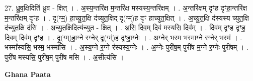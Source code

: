 \documentclass[17pt]{extarticle}
\begin{document}
27. ध्रु॒व॒क्षिदिति॑ ध्रुव - क्षित् । . अ॒स्य॒न्तरि॑क्ष म॒न्तरि॑क्ष मस्यस्य॒न्तरि॑क्षम् । . अ॒न्तरि॑क्षम् दृꣳह दृꣳहा॒न्तरि॑क्ष म॒न्तरि॑क्षम् दृꣳह । . दृ॒(ग्म्॒) हा॒च्यु॒त॒क्षि द॑च्युत॒क्षिद् दृ(ग्म्॑)ह दृꣳ हाच्युत॒क्षित् । . अ॒च्यु॒त॒क्षि द॑स्यस्य च्युत॒क्षि द॑च्युत॒क्षि द॑सि । . अ॒च्यु॒त॒क्षिदित्य॑च्युत - क्षित् । . अ॒सि॒ दिव॒म् दिव॑ मस्यसि॒ दिव᳚म् । . दिव॑म् दृꣳह दृꣳह॒ दिव॒म् दिव॑म् दृꣳह । . दृ॒(ग्म्॒)हा॒ग्ने र॒ग्नेर् दृ(ग्म्॑)ह दृꣳहा॒ग्नेः । . अ॒ग्नेर् भस्म॒ भस्मा॒ग्ने र॒ग्नेर् भस्म॑ । . भस्मा᳚स्यसि॒ भस्म॒ भस्मा॑सि । . अ॒स्य॒ग्ने र॒ग्ने र॑स्यस्य॒ग्नेः । . अ॒ग्नेः पुरी॑ष॒म् पुरी॑ष म॒ग्ने र॒ग्नेः पुरी॑षम् । . पुरी॑ष मस्यसि॒ पुरी॑ष॒म् पुरी॑ष मसि । . अ॒सीत्य॑सि । \newline

\textbf{Ghana Paata } \newline
\end{document}
